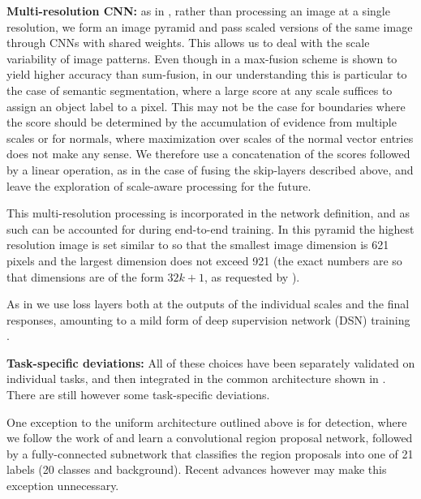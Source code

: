 \documentclass[10pt,twocolumn,letterpaper]{article}
\begin{document}

\textbf{{Multi-resolution CNN:}} as in \cite{jacobs14,PapandreouKS15,iclr16,ChenYWXY15}, rather than processing an image at a single resolution, we form an image pyramid and pass  scaled versions of the same image through CNNs with shared weights. This allows us to deal with the scale variability of image patterns. Even though in \cite{ChenYWXY15} a max-fusion scheme is shown to yield higher accuracy than sum-fusion, in our understanding this is particular to the case of semantic segmentation, where a large score at any scale suffices to assign an object label to a pixel. This may not be the case for boundaries where the score should be determined by the accumulation of evidence from multiple scales \cite{witkin} or for normals, where maximization over scales of the normal vector entries does not make any sense. 
We therefore use a concatenation of the scores followed by a linear operation, as in the case of fusing the skip-layers described above, and leave the exploration of  scale-aware processing \cite{ChenYWXY15} for the future.


This multi-resolution  processing is incorporated in the network definition, and as such can be accounted for during end-to-end training.  
In this pyramid the highest resolution image is set similar to \cite{Girshick15} so that the smallest image dimension is 621 pixels and the largest dimension does not exceed 921 (the exact numbers are so that dimensions are of the form $32k +1$, as requested by \cite{iclr16,ChenYWXY15}).

As in \cite{iclr16,ChenYWXY15} we use loss layers both at the outputs of the individual scales and  the final responses, amounting to a mild form of deep supervision network (DSN)  training \cite{hed}.


{\textbf{Task-specific deviations:}}
All of these choices have been separately validated on individual tasks, and then integrated in the common architecture shown in . 
There are still however some task-specific deviations.

 One  exception to the uniform architecture  outlined above is for detection, where we follow the work of \cite{RenHGS15} and learn a convolutional region proposal network,  followed by a fully-connected subnetwork that classifies the region proposals into one of  21 labels (20 classes and background). Recent advances however \cite{DaiLHS16,ssd}  may make this exception unnecessary.
 
\end{document}
